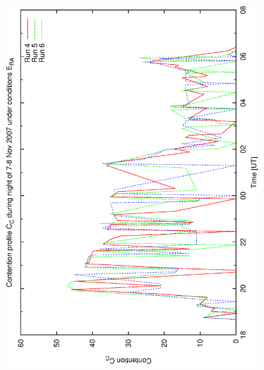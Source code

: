 \begin{figure}[h]
\begin{center}
{   \includegraphics[scale=0.25, angle=-90]{figures/bsb_rnd2_cont.eps}
  } 


\end{center}
\end{figure}
